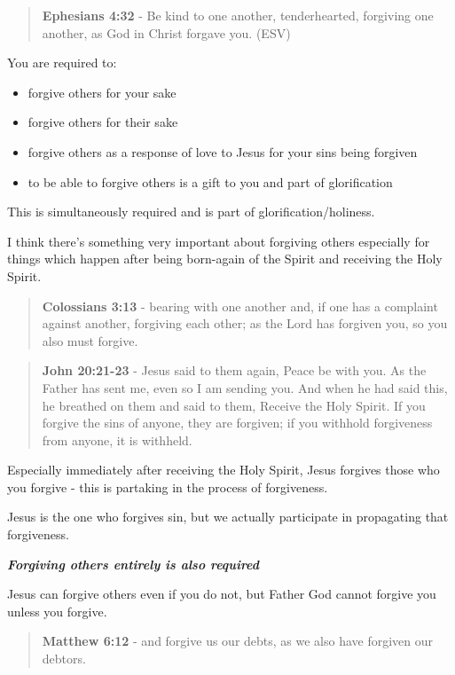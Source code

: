 \documentclass[11pt]{article}
\begin{document}
\begin{quote}
\textbf{Ephesians 4:32} - Be kind to one another, tenderhearted, forgiving one another, as God in Christ forgave you. (ESV)
\end{quote}

You are required to:
\begin{itemize}
\item forgive others for your sake
\item forgive others for their sake
\item forgive others as a response of love to Jesus for your sins being forgiven
\item to be able to forgive others is a gift to you and part of glorification
\end{itemize}

This is simultaneously required and is part of glorification/holiness.

I think there's something very important about forgiving others especially for things which happen after being born-again of the Spirit and receiving the Holy Spirit.

\begin{quote}
\textbf{Colossians 3:13} - bearing with one another and, if one has a complaint against another, forgiving each other; as the Lord has forgiven you, so you also must forgive.
\end{quote}

\begin{quote}
\textbf{John 20:21-23} - Jesus said to them again, Peace be with you. As the Father has sent me, even so I am sending you. And when he had said this, he breathed on them and said to them, Receive the Holy Spirit. If you forgive the sins of anyone, they are forgiven; if you withhold forgiveness from anyone, it is withheld.
\end{quote}

Especially immediately after receiving the Holy Spirit, Jesus forgives those who you forgive - this is partaking in the process of forgiveness.

Jesus is the one who forgives sin, but we actually participate in propagating that forgiveness.

\emph{\textbf{Forgiving others entirely is also required}}

Jesus can forgive others even if you do not, but Father God cannot forgive you unless you forgive.

\begin{quote}
\textbf{Matthew 6:12} - and forgive us our debts, as we also have forgiven our debtors.
\end{quote}
\end{document}
